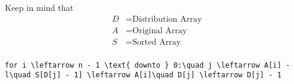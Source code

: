 \documentclass[preview]{standalone}
\begin{document}
\begin{center}
Keep in mind that\begin{align*}D & = \text{Distribution Array} \\A & = \text{Original Array} \\S & = \text{Sorted Array} \\\end{align*}\begin{verbatim}for i \leftarrow n - 1 \text{ downto } 0:\quad j \leftarrow A[i] - l\quad S[D[j] - 1] \leftarrow A[i]\quad D[j] \leftarrow D[j] - 1\end{verbatim}\vrule
\end{center}
\end{document}
